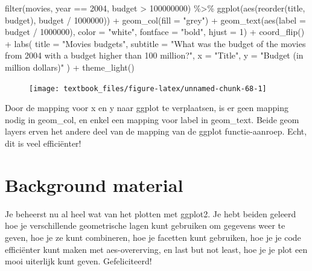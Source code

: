 \documentclass[]{tufte-book}
\newenvironment{Shaded}{}{}
\newcommand{\AttributeTok}[1]{\textcolor[rgb]{0.49,0.56,0.16}{#1}}
\newcommand{\DecValTok}[1]{\textcolor[rgb]{0.25,0.63,0.44}{#1}}
\newcommand{\FunctionTok}[1]{\textcolor[rgb]{0.02,0.16,0.49}{#1}}
\newcommand{\NormalTok}[1]{#1}
\newcommand{\SpecialCharTok}[1]{\textcolor[rgb]{0.25,0.44,0.63}{#1}}
\newcommand{\StringTok}[1]{\textcolor[rgb]{0.25,0.44,0.63}{#1}}
\begin{document}
\begin{Shaded}
\begin{Highlighting}[]
\FunctionTok{filter}\NormalTok{(movies, year }\SpecialCharTok{==} \DecValTok{2004}\NormalTok{, budget }\SpecialCharTok{\textgreater{}} \DecValTok{100000000}\NormalTok{) }\SpecialCharTok{\%\textgreater{}\%}
  \FunctionTok{ggplot}\NormalTok{(}\FunctionTok{aes}\NormalTok{(}\FunctionTok{reorder}\NormalTok{(title, budget), budget }\SpecialCharTok{/} \DecValTok{1000000}\NormalTok{)) }\SpecialCharTok{+}
  \FunctionTok{geom\_col}\NormalTok{(}\AttributeTok{fill =} \StringTok{"grey"}\NormalTok{) }\SpecialCharTok{+}
  \FunctionTok{geom\_text}\NormalTok{(}\FunctionTok{aes}\NormalTok{(}\AttributeTok{label =}\NormalTok{ budget }\SpecialCharTok{/} \DecValTok{1000000}\NormalTok{), }\AttributeTok{color =} \StringTok{"white"}\NormalTok{, }\AttributeTok{fontface =} \StringTok{"bold"}\NormalTok{, }\AttributeTok{hjust =} \DecValTok{1}\NormalTok{) }\SpecialCharTok{+}
  \FunctionTok{coord\_flip}\NormalTok{() }\SpecialCharTok{+}
  \FunctionTok{labs}\NormalTok{(}
    \AttributeTok{title =} \StringTok{"Movies budgets"}\NormalTok{,}
    \AttributeTok{subtitle =} \StringTok{"What was the budget of the movies from 2004 with a budget higher than 100 million?"}\NormalTok{,}
    \AttributeTok{x =} \StringTok{"Title"}\NormalTok{,}
    \AttributeTok{y =} \StringTok{"Budget (in million dollars)"}
\NormalTok{  ) }\SpecialCharTok{+}
  \FunctionTok{theme\_light}\NormalTok{()}
\end{Highlighting}
\end{Shaded}

\begin{figure}
\texttt{[image: textbook\_files/figure-latex/unnamed-chunk-68-1]} \end{figure}

Door de mapping voor x en y naar ggplot te verplaatsen, is er geen mapping nodig in geom\_col, en enkel een mapping voor label in geom\_text. Beide geom layers erven het andere deel van de mapping van de ggplot functie-aanroep. Echt, dit is veel efficiënter!

\hypertarget{background-material}{%
\section{Background material}\label{background-material}}

Je beheerst nu al heel wat van het plotten met ggplot2. Je hebt beiden geleerd hoe je verschillende geometrische lagen kunt gebruiken om gegevens weer te geven, hoe je ze kunt combineren, hoe je facetten kunt gebruiken, hoe je je code efficiënter kunt maken met aes-overerving, en last but not least, hoe je je plot een mooi uiterlijk kunt geven. Gefeliciteerd!
\end{document}
